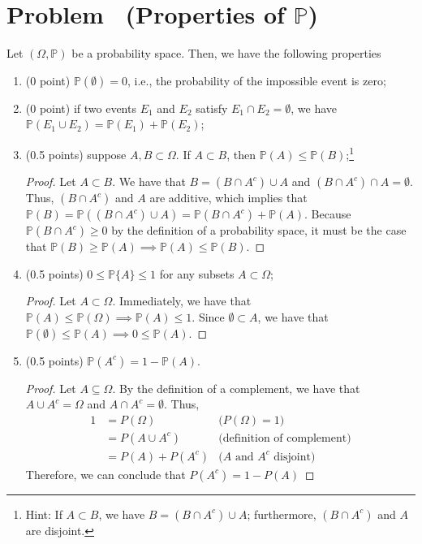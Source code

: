 \documentclass[11pt]{article}
\newcounter{pppp}
\newcommand{\prob}{\arabic{pppp}} %
\newcommand{\increase}{\addtocounter{pppp}{1}} %
\newcommand{\newproblem}[2]{
    \increase
    \section*{Problem \prob~(#1) \hfill {#2}}
}
\newcommand{\p}{\mathbb{P}}
\begin{document}
\newproblem{Properties of $\mathbb{P}$}{ }

Let $(\Omega, \mathbb{P})$ be a probability space. Then, we have the following properties
\begin{enumerate}
\item (0 point) $\mathbb{P}(\emptyset)=0$, i.e., the probability of the impossible event is zero; 
\item (0 point) if two events $E_1$ and $E_2$ satisfy $E_1\cap E_2=\emptyset$, we have $\mathbb{P}(E_1\cup E_2)=\mathbb{P}(E_1)+ \mathbb{P}(E_2)$;
\item (0.5 points) suppose $A,B\subset\Omega$. If $A\subset B$, then $\mathbb{P}(A)\le \mathbb{P}(B)$;\footnote{Hint: If $A\subset B$, we have $B=(B\cap A^c)\cup A$; furthermore, $(B\cap A^c)$ and $A$ are disjoint.}

\begin{proof}
  Let \(A\subset B\). We have that \(B=(B\cap A^c)\cup A\) and \((B\cap A^c)\cap A=\emptyset\).
  Thus, \((B\cap A^c)\) and \(A\) are additive, which implies that \(\p(B)=\p((B\cap A^c)\cup A) = \p(B\cap A^c) + \p(A)\).
  Because \(\p(B\cap A^c)\geq 0\) by the definition of a probability space, it must be the case that
  \(\p(B)\geq \p(A)\implies \p(A)\leq\p(B)\).
\end{proof}

\item (0.5 points) $0\le \mathbb{P}\{A\} \le 1$ for any subsets $A \subset \Omega$; 

\begin{proof}
  Let \(A\subset\Omega\). Immediately, we have that \(\p(A)\leq\p(\Omega)\implies\p(A)\leq 1\). Since \(\emptyset\subset A\), we have that \(\p(\emptyset)\leq\p(A)\implies0\leq\p(A)\).
\end{proof}

\item (0.5 points) $\mathbb{P}(A^c)=1-\mathbb{P}(A)$.

\begin{proof}
  Let \(A\subseteq \Omega\). By the definition of a complement, we have that \(A\cup A^c=\Omega\)
  and \(A\cap A^c=\emptyset\). Thus,
  \begin{align*}
     1 &= P(\Omega) & \text{(\(P(\Omega)=1\))}\\
     &= P(A\cup A^c) & \text{(definition of complement)}\\
     &=P(A)+P(A^c) & \text{(\(A\) and \(A^c\) disjoint)}
  \end{align*}
  Therefore, we can conclude that \(P(A^c)=1-P(A)\)
\end{proof}


\end{enumerate}
\end{document}
